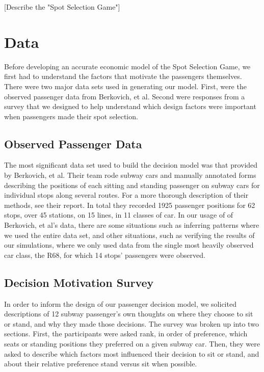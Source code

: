 \documentclass{acm_proc_article-sp}
\begin{document}
[Describe the "Spot Selection Game"]

\section{Data}
Before developing an accurate economic model of the Spot Selection Game, we first had to understand the factors that motivate the passengers themselves. There were two major data sets used in generating our model. First, were the observed passenger data from Berkovich, et al. Second were responses from a survey that we designed to help understand which design factors were important when passengers made their spot selection.

\subsection{Observed Passenger Data}
The most significant data set used to build the decision model was that provided by Berkovich, et al. Their team rode subway cars and manually annotated forms describing the positions of each sitting and standing passenger on subway cars for individual stops along several routes. For a more thorough description of their methods, see their report\cite{berkovich2013observed}. In total they recorded 1925 passenger positions for 62 stops, over 45 stations, on 15 lines, in 11 classes of car. In our usage of of Berkovich, et al's data, there are some situations such as inferring patterns where we used the entire data set, and other situations, such as verifying the results of our simulations, where we only used data from the single most heavily observed car class, the R68, for which 14 stops' passengers were observed.

\subsection{Decision Motivation Survey}
In order to inform the design of our passenger decision model, we solicited descriptions of 12 subway passenger's own thoughts on where they choose to sit or stand, and why they made those decisions. The survey was broken up into two sections. First, the participants were asked rank, in order of preference, which seats or standing positions they preferred on a given subway car. Then, they were asked to describe which factors most influenced their decision to sit or stand, and about their relative preference stand versus sit when possible.
\end{document}
